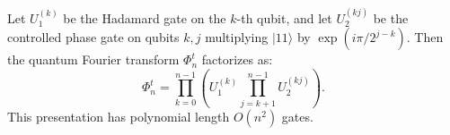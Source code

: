 Let $U_1^{(k)}$ be the Hadamard gate on the $k$-th qubit, and let $U_2^{(kj)}$ be the controlled phase gate on qubits $k,j$ multiplying $|11\rangle$ by $\exp(i\pi/2^{j-k})$. Then the quantum Fourier transform $\Phi_n^t$ factorizes as:
$$\Phi_n^t = \prod_{k=0}^{n-1} \left( U_1^{(k)} \prod_{j=k+1}^{n-1} U_2^{(kj)} \right).$$
This presentation has polynomial length $O(n^2)$ gates.
